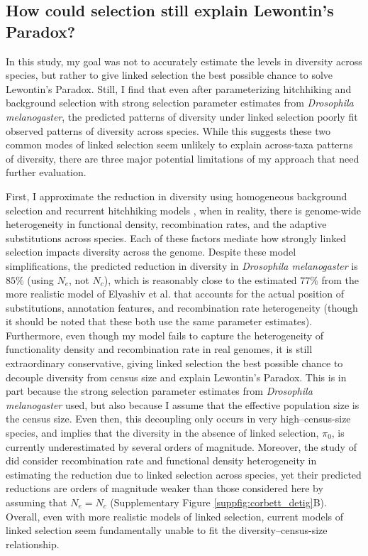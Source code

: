 \documentclass[11pt]{article}
\begin{document}
\subsection*{How could selection still explain Lewontin's Paradox?}

In this study, my goal was not to accurately estimate the levels in diversity
across species, but rather to give linked selection the best possible chance to
solve Lewontin's Paradox. Still, I find that even after parameterizing
hitchhiking and background selection with strong selection parameter estimates
from \emph{Drosophila melanogaster}, the predicted patterns of diversity under
linked selection poorly fit observed patterns of diversity across species.
While this suggests these two common modes of linked selection seem unlikely to
explain across-taxa patterns of diversity, there are three major potential
limitations of my approach that need further evaluation. 

First, I approximate the reduction in diversity using homogeneous background
selection and recurrent hitchhiking models
\parencite{Kaplan1989-sc,Hudson1995-xc,Coop2012-cd}, when in reality, there is
genome-wide heterogeneity in functional density, recombination rates, and the
adaptive substitutions across species. Each of these factors mediate how
strongly linked selection impacts diversity across the genome. Despite these
model simplifications, the predicted reduction in diversity in \emph{Drosophila
melanogaster} is $85\%$ (using $N_e$, not $N_c$), which is reasonably close to
the estimated $77\%$ from the more realistic model of Elyashiv et al. that
accounts for the actual position of substitutions, annotation features, and
recombination rate heterogeneity (though it should be noted that these both use
the same parameter estimates). Furthermore, even though my model fails to
capture the heterogeneity of functionality density and recombination rate in
real genomes, it is still extraordinary conservative, giving linked selection
the best possible chance to decouple diversity from census size and explain
Lewontin's Paradox. This is in part because the strong selection parameter
estimates from \emph{Drosophila melanogaster} used, but also because I assume
that the effective population size is the census size. Even then, this
decoupling only occurs in very high--census-size species, and implies that the
diversity in the absence of linked selection, $\pi_0$, is currently
underestimated by several orders of magnitude. Moreover, the study of
\textcite{Corbett-Detig2015-gt} did consider recombination rate and functional
density heterogeneity in estimating the reduction due to linked selection
across species, yet their predicted reductions are orders of magnitude weaker
than those considered here by assuming that $N_e = N_c$ (Supplementary Figure
\ref{suppfig:corbett_detig}B).  Overall, even with more realistic models of
linked selection, current models of linked selection seem fundamentally unable
to fit the diversity--census-size relationship.
\end{document}
